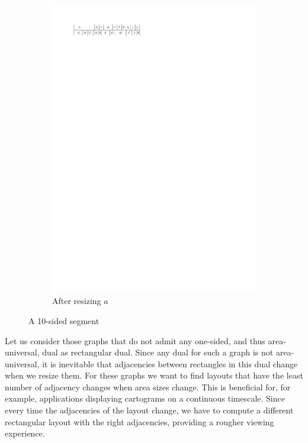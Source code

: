 \begin{figure}[b]
\begin{subfigure}[b]{0.45 \textwidth}
      \includegraphics[width=\textwidth]{introduction/img/10sidedAfter.pdf}
      \caption{After resizing $a$}
      \label{fig:intro:10sidedAfter}
    \end{subfigure}
    \quad
    \caption{A 10-sided segment}
    \label{fig:intro:10sided}
  \end{figure}
  Let us consider those graphs that do not admit any one-sided, and thus area-universal, dual as rectangular dual.
  Since any dual for such a graph is not area-universal, it is inevitable that adjacencies between rectangles in this dual change when we resize them.
  For these graphs we want to find layouts that have the least number of adjacency changes when area sizes change.
  This is beneficial for, for example, applications displaying cartograms on a continuous timescale.
  Since every time the adjacencies of the layout change, we have to compute a different rectangular layout with the right adjacencies, providing a rougher viewing experience.

